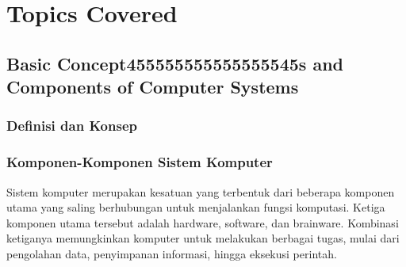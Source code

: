 \documentclass[12pt]{article}
\begin{document}
\section{Topics Covered}

\subsection{Basic Concept455555555555555545s and Components of Computer Systems}
    \subsubsection{Definisi dan Konsep}
    \subsubsection{Komponen-Komponen Sistem Komputer}
    Sistem komputer merupakan kesatuan yang terbentuk dari beberapa komponen utama yang saling berhubungan untuk menjalankan fungsi komputasi. Ketiga komponen utama tersebut adalah hardware, software, dan brainware. Kombinasi ketiganya memungkinkan komputer untuk melakukan berbagai tugas, mulai dari pengolahan data, penyimpanan informasi, hingga eksekusi perintah.
\end{document}
